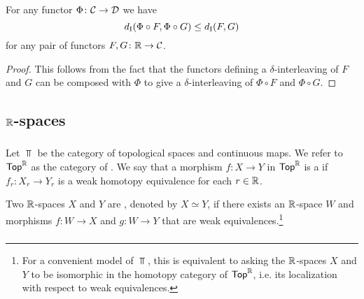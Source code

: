 
\medskip\lemma For any functor $\Phi \colon \mathcal{C} \to \mathcal{D}$ we have
\[
d_{\mathrm{I}}(\Phi \circ F, \Phi \circ G) \leq d_{\mathrm{I}}(F, G)
\]
for any pair of functors $F, G \colon \mathbb{R} \to \mathcal{C}$.

\begin{proof}
	This follows from the fact that the functors defining a $\delta$-interleaving of $F$ and $G$ can be composed with $\Phi$ to give a $\delta$-interleaving of $\Phi \circ F$ and $\Phi \circ G$.  
\end{proof}


\subsection{$\mathbb{R}$-spaces}

\subsubsection{}
Let $\Top$ be the category of topological spaces and continuous maps.
We refer to $\mathsf{Top}^{\mathbb{R}}$ as the category of .
We say that a morphism $f \colon X \to Y$ in $\mathsf{Top}^{\mathbb{R}}$ is a  if $f_r \colon X_r \to Y_r$ is a weak homotopy equivalence for each $r \in \mathbb{R}$.

Two $\mathbb{R}$-spaces $X$ and $Y$ are , denoted by $X \simeq Y$, if there exists an $\mathbb{R}$-space $W$ and morphisms $f \colon W \to X$ and $g \colon W \to Y$ that are weak equivalences.\footnote{
For a convenient model of $\Top$, this is equivalent to asking the $\mathbb{R}$-spaces $X$ and $Y$ to be isomorphic in the homotopy category of $\mathsf{Top}^{\mathbb{R}}$, i.e. its localization with respect to weak equivalences.}

\subsubsection{}\label{def:dhi}

